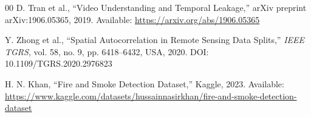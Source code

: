 \documentclass[conference]{IEEEtran}
\begin{document}
\begin{thebibliography}{00}
D. Tran et al.,
``Video Understanding and Temporal Leakage,''
arXiv preprint arXiv:1906.05365, 2019. Available: \url{https://arxiv.org/abs/1906.05365}

Y. Zhong et al.,
``Spatial Autocorrelation in Remote Sensing Data Splits,''
\textit{IEEE TGRS}, vol. 58, no. 9, pp. 6418--6432, USA, 2020. DOI: 10.1109/TGRS.2020.2976823

H. N. Khan,
``Fire and Smoke Detection Dataset,''
Kaggle, 2023. Available: \url{https://www.kaggle.com/datasets/hussainnasirkhan/fire-and-smoke-detection-dataset}

\end{thebibliography}

\balance
\end{document}
